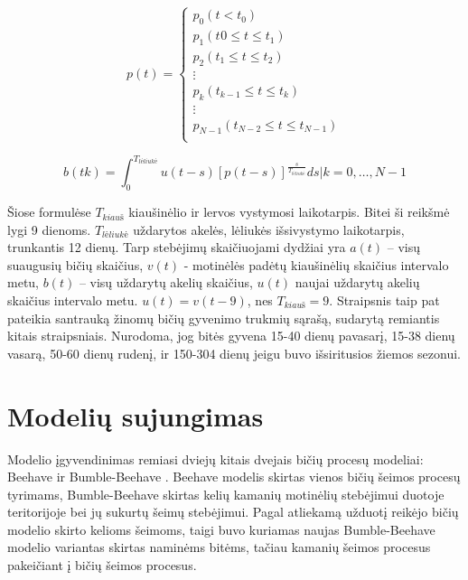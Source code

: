 \documentclass{VUMIFPSmagistrinis}
\begin{document}
\begin{equation}
\label{emir4}
p(t)=
\begin{cases}
p_{0} (t<t_0 )                                           \\
p_{1} (t_{}0≤t≤t_{1} )                          \\
p_{2} (t_{1}≤t≤t_{2} )                                \\
\vdots \\
p_{k} (t_{k-1}≤t≤t_{k} )                               \\
\vdots \\
p_{N-1} (t_{N-2}≤t≤t_{N-1} )   \\
\end{cases}
\end{equation}

\begin{equation}
\label{emir5}
b(tk)=\int_{0}^{T_{l\text{\.e}liuk\text{\.e}}}u(t-s) [p(t-s)]^{\frac{s}{T_{l\text{\.e}liuk\text{\.e}}}} ds | k=0,…,N-1
\end{equation}

Šiose formulėse $T_{kiau\textit{\v{s}}}$ kiaušinėlio ir lervos vystymosi laikotarpis. Bitei ši reikšmė lygi 9 dienoms. $T_{l\textit{\.e}liuk\textit{\.e}}$ uždarytos akelės, lėliukės išsivystymo laikotarpis, trunkantis 12 dienų. Tarp stebėjimų skaičiuojami dydžiai yra $a(t)$ – visų suaugusių bičių skaičius, $v(t)$ - motinėlės padėtų kiaušinėlių skaičius intervalo metu, $b(t)$ – visų uždarytų akelių skaičius, $u(t)$ naujai uždarytų akelių skaičius intervalo metu. $u(t)=v(t-9)$, nes $T_{kiau\textit{\v{s}}}=9$. 
Straipsnis taip pat pateikia santrauką žinomų bičių gyvenimo trukmių sąrašą, sudarytą remiantis kitais straipsniais. Nurodoma, jog bitės gyvena 15-40 dienų pavasarį, 15-38 dienų vasarą, 50-60 dienų rudenį, ir 150-304 dienų jeigu buvo išsiritusios žiemos sezonui.




\section{Modelių sujungimas}

Modelio įgyvendinimas remiasi dviejų kitais dvejais bičių procesų modeliai: Beehave \cite{BGT14} ir Bumble-Beehave \cite{BDP18}. Beehave modelis skirtas vienos bičių šeimos procesų tyrimams, Bumble-Beehave skirtas kelių kamanių motinėlių stebėjimui duotoje teritorijoje bei jų sukurtų šeimų stebėjimui. Pagal atliekamą užduotį reikėjo bičių modelio skirto kelioms šeimoms, taigi buvo kuriamas naujas Bumble-Beehave modelio variantas skirtas naminėms bitėms, tačiau kamanių šeimos procesus pakeičiant į bičių šeimos procesus.
\end{document}

